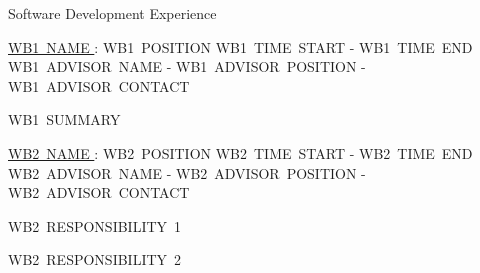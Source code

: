 \documentclass{resume} %
\begin{document}
  \begin{rSection}{Software Development Experience}

    \begin{rSubsection}{\underline{WB1~NAME }: WB1~POSITION }{ WB1~TIME~START - WB1~TIME~END }{ WB1~ADVISOR~NAME - WB1~ADVISOR~POSITION - WB1~ADVISOR~CONTACT }

      \item WB1~SUMMARY

    \end{rSubsection}

    \begin{rSubsection}{\underline{WB2~NAME }: WB2~POSITION }{ WB2~TIME~START - WB2~TIME~END }{ WB2~ADVISOR~NAME - WB2~ADVISOR~POSITION - WB2~ADVISOR~CONTACT }

      
      \item WB2~RESPONSIBILITY~1

      \item WB2~RESPONSIBILITY~2
      

    \end{rSubsection}

  \end{rSection}


 
\end{document}
